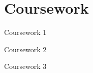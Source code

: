 \vspace{-0.65cm}
\section{Coursework}
\resumeSubHeadingListStart
    \vspace{-0.25cm}
    \resumeItemListStart
        \item {Coursework 1}
        \item {Coursework 2}
        \item {Coursework 3}
    \resumeItemListEnd
\resumeSubHeadingListEnd

